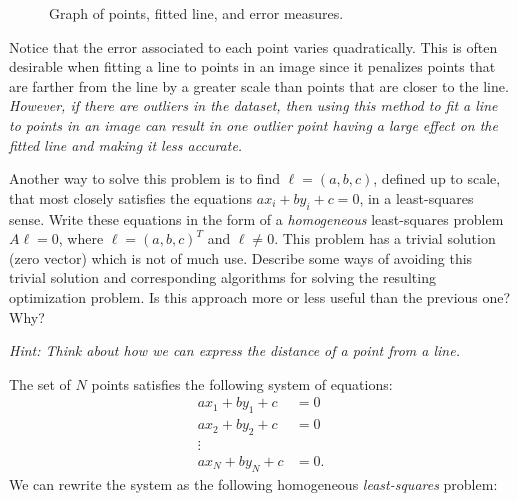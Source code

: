 \begin{problem}
\begin{enumroman}
\begin{answer}
\begin{figure}[H]
          \caption{Graph of points, fitted line, and error measures.}
        \end{figure}
        Notice that the error associated to each point varies quadratically.
        This is often desirable when fitting a line to points in an image
        since it penalizes points that are farther from the line by a
        greater scale than points that are closer to the line.
        \emph{
          However, if there are outliers in the dataset,
          then using this method to fit a line to points in an image
          can result in one outlier point having a large effect on the
          fitted line and making it less accurate.
        } \\
      \end{answer}

    \newpage
    \item Another way to solve this problem is to find
      $\ell = (a, b, c)$, defined up to scale, that
      most closely satisfies the equations $ax_i + by_i + c = 0$,
      in a least-squares sense.
      Write these equations in the form of a \emph{homogeneous}
      least-squares problem $A \ell = 0$, where $\ell = (a, b, c)^T$
      and $\ell \ne 0$.
      This problem has a trivial solution (zero vector) which is not
      of much use. Describe some ways of avoiding this trivial solution
      and corresponding algorithms for solving the resulting
      optimization problem. Is this approach more or less
      useful than the previous one? Why?
      
      \step
      \emph{Hint: Think about how we can express the distance of a
      point from a line.}
      \begin{answer}
        The set of $N$ points satisfies the following system of equations:
        \begin{align*}
          ax_1 + by_1 + c &= 0 \\
          ax_2 + by_2 + c &= 0 \\
          \vdots \\
          ax_N + by_N + c &= 0.
        \end{align*}
        We can rewrite the system as the following homogeneous
        \emph{least-squares} problem:


\end{answer}
\end{enumroman}
\end{problem}
